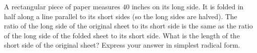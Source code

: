 A rectangular piece of paper measures $40$ inches on its long side. It is folded in half along a line parallel to its short sides (so the long sides are halved). The ratio of the long side of the original sheet to its short side is the same as the ratio of the long side of the folded sheet to its short side. What is the length of the short side of the original sheet? Express your answer in simplest radical form.
